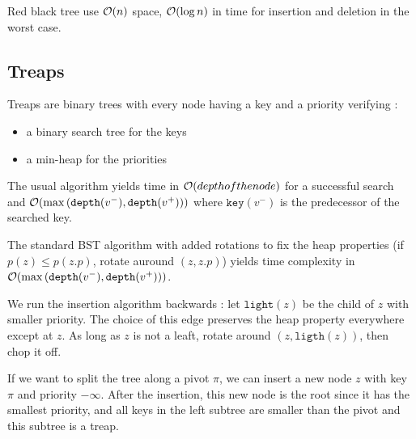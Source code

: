 \documentclass[12pt]{cours}
\begin{document}
\begin{proposition}[Complexity]
    Red black tree use $\mathcal{O}(n)$ space, $\mathcal{O}(\log n)$ in time for insertion and deletion in the worst case. %
\end{proposition}

\subsection{Treaps}
\begin{definition}
    Treaps are binary trees with every node having a key and a priority verifying :
    \begin{itemize}
        \item a binary search tree for the keys
        \item a min-heap for the priorities
    \end{itemize}
\end{definition}

\begin{proposition}[Search]
    The usual algorithm yields time in $\mathcal{O}(depth of the node)$ for a successful search and $\mathcal{O}(\max \left(\texttt{depth}(v^{-}), \texttt{depth}(v^{+})\right))$ where $\texttt{key}(v^{-})$ is the predecessor of the searched key.
\end{proposition}

\begin{proposition}[Insertion]
    The standard BST algorithm with added rotations to fix the heap properties (if $p(z) \leq p(z.p)$, rotate auround $(z, z.p)$) yields time complexity in $\mathcal{O}(\max\left(\texttt{depth}(v^{-}), \texttt{depth}(v^{+})\right))$.
\end{proposition}

\begin{proposition}[Deletion]
    We run the insertion algorithm backwards : let $\texttt{light}(z)$ be the child of $z$ with smaller priority. The choice of this edge preserves the heap property everywhere except at $z$. As long as $z$ is not a leaft, rotate around $(z, \texttt{ligth}(z))$, then chop it off.
\end{proposition}

\begin{proposition}[Split]
    If we want to split the tree along a pivot $\pi$, we can insert a new node $z$ with key $\pi$ and priority $-\infty$. After the insertion, this new node is the root since it has the smallest priority, and all keys in the left subtree are smaller than the pivot and this subtree is a treap.
\end{proposition}
\end{document}

